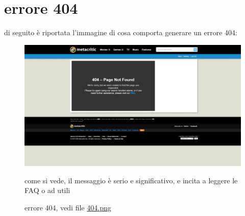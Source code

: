 \documentclass[12pt]{article}
\begin{document}
\section{errore 404}
di seguito è riportata l'immagine di cosa comporta generare un errore 404:\\
\begin{figure}[H]
	\begin{center}
		\includegraphics[width=13.5cm]{404.png}
		\caption{errore 404, vedi file \href{404.png}{404.png}}
	\end{center}
	come si vede, il messaggio è serio e significativo, e incita a leggere le FAQ o ad utili
\end{figure}
\newpage
\end{document}
